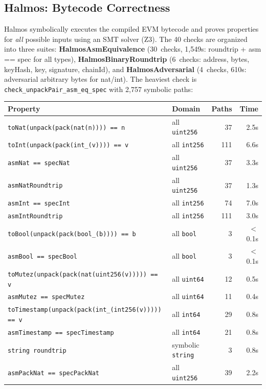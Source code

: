 \documentclass[11pt,a4paper]{article}
\begin{document}
\subsection{Halmos: Bytecode Correctness}

Halmos symbolically executes the compiled EVM bytecode and proves properties
for \emph{all} possible inputs using an SMT solver (Z3). The 40 checks are
organized into three suites: \textbf{HalmosAsmEquivalence} (30~checks, 1{,}549s:
roundtrip + asm == spec for all types), \textbf{HalmosBinaryRoundtrip}
(6~checks: address, bytes, keyHash, key, signature, chainId),
and \textbf{HalmosAdversarial} (4~checks, 610s: adversarial arbitrary bytes
for nat/int). The heaviest check is \texttt{check\_unpackPair\_asm\_eq\_spec}
with 2{,}757 symbolic paths:

\begin{center}
\begin{tabular}{@{}llrr@{}}
\toprule
\textbf{Property} & \textbf{Domain} & \textbf{Paths} & \textbf{Time} \\
\midrule
\texttt{toNat(unpack(pack(nat(n)))) == n} & all \texttt{uint256} & 37 & 2.5s \\
\texttt{toInt(unpack(pack(int\_(v)))) == v} & all \texttt{int256} & 111 & 6.6s \\
\texttt{asmNat == specNat} & all \texttt{uint256} & 37 & 3.3s \\
\texttt{asmNatRoundtrip} & all \texttt{uint256} & 37 & 1.3s \\
\texttt{asmInt == specInt} & all \texttt{int256} & 74 & 7.0s \\
\texttt{asmIntRoundtrip} & all \texttt{int256} & 111 & 3.0s \\
\texttt{toBool(unpack(pack(bool\_(b)))) == b} & all \texttt{bool} & 3 & $<$0.1s \\
\texttt{asmBool == specBool} & all \texttt{bool} & 3 & $<$0.1s \\
\texttt{toMutez(unpack(pack(nat(uint256(v))))) == v} & all \texttt{uint64} & 12 & 0.5s \\
\texttt{asmMutez == specMutez} & all \texttt{uint64} & 11 & 0.4s \\
\texttt{toTimestamp(unpack(pack(int\_(int256(v))))) == v} & all \texttt{int64} & 29 & 0.8s \\
\texttt{asmTimestamp == specTimestamp} & all \texttt{int64} & 21 & 0.8s \\
\texttt{string roundtrip} & symbolic \texttt{string} & 3 & 0.8s \\
\texttt{asmPackNat == specPackNat} & all \texttt{uint256} & 39 & 2.2s \\

\end{tabular}
\end{center}
\end{document}
